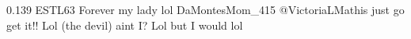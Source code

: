 {0.139}
{\joinNameTweet
{ESTL63}
{Forever my lady lol}}
{\joinNameTweet
{DaMontesMom\_415}
{@VictoriaLMathis just go get it!! Lol (the devil) aint I? Lol but I would lol}}
%
%
%
%
%
%
%
%
%
%
